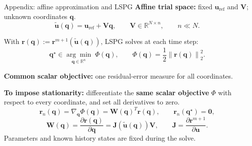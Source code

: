 \documentclass[aspectratio=169]{beamer}
\newcommand{\vect}[1]{\boldsymbol{#1}}
\newcommand{\matr}[1]{\boldsymbol{#1}}
\begin{document}
\begin{frame}{Appendix: affine approximation and LSPG}
\small
\setlength{\abovedisplayskip}{6pt}
\setlength{\belowdisplayskip}{6pt}
\setlength{\abovedisplayshortskip}{6pt}
\setlength{\belowdisplayshortskip}{6pt}
\textbf{Affine trial space:} fixed $\vect{u}_{\mathrm{ref}}$ and $\matr{V}$; unknown coordinates $\vect{q}$.
\[
  \widetilde{\vect{u}}(\vect{q})
  =\vect{u}_{\mathrm{ref}}+\matr{V}\vect{q},
  \qquad
  \matr{V}\in\mathbb R^{N\times n},
  \qquad n\ll N.
\]

With $\vect{r}(\vect{q}):=\vect{r}^{m+1}(\widetilde{\vect{u}}(\vect{q}))$,
LSPG solves at each time step:
\[
  \vect{q}^{\star}\in
  \underset{\vect{q}\in\mathbb R^n}{\arg\min}\;\Phi(\vect{q}),
  \qquad
  \Phi(\vect{q})=\frac12\left\|\vect{r}(\vect{q})\right\|_2^2.
\]

\textbf{Common scalar objective:} one residual-error measure for all coordinates.

\textbf{To impose stationarity:} differentiate the \textbf{same scalar objective} $\Phi$
with respect to every coordinate, and set all derivatives to zero.
\[
  \vect{r}_n(\vect{q})
  =\nabla_{\vect{q}}\Phi(\vect{q})
  =\matr{W}(\vect{q})^T\vect{r}(\vect{q}),
  \qquad
  \vect{r}_n(\vect{q}^{\star})=\vect{0},
\]
\[
  \matr{W}(\vect{q})
  =\frac{\partial\vect{r}(\vect{q})}{\partial\vect{q}}
  =\matr{J}(\widetilde{\vect{u}}(\vect{q}))\matr{V},
  \qquad
  \matr{J}=\frac{\partial\vect{r}^{m+1}}{\partial\vect{u}}.
\]
{\footnotesize Parameters and known history states are fixed during the solve.}
\end{frame}
\end{document}
